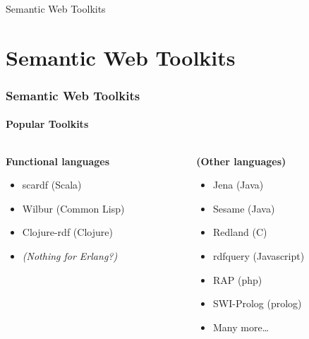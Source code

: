 \documentclass{beamer}
\begin{document}
\begin{frame}

\huge
\begin{center}
Semantic Web Toolkits
\end{center}


\end{frame}


\section{Semantic Web Toolkits}

\begin{frame}
\frametitle{Semantic Web Toolkits}
\framesubtitle{Popular Toolkits}

\begin{columns}[t]
\begin{column}{0.45\textwidth}

\textbf{Functional languages}
\begin{itemize}
\item scardf (Scala)
\item Wilbur (Common Lisp)
\item Clojure-rdf (Clojure)
\item \emph{(Nothing for Erlang?)}
\end{itemize}


\end{column}

  \begin{column}{0.45\textwidth}

\textbf{(Other languages)}
\begin{itemize}
\item Jena (Java)
\item Sesame (Java)
\item Redland (C)
\item rdfquery (Javascript)
\item RAP (php)
\item SWI-Prolog (prolog)
\item Many more\ldots
\end{itemize}



 \end{column}
\end{columns}

\end{frame}
\end{document}
